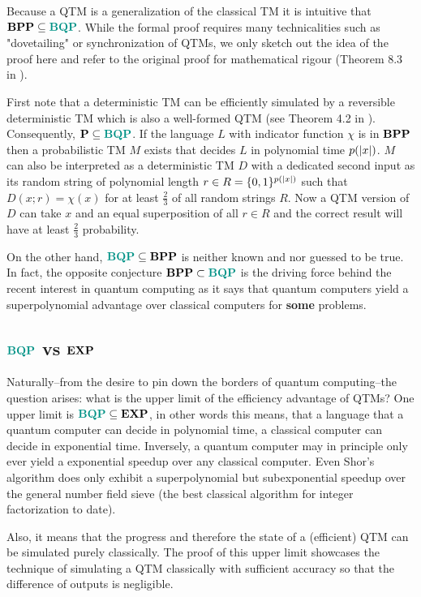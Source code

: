 Because a \ac{QTM} is a generalization of the classical \ac{TM} it is intuitive that $\BPP\subseteq\BQP$.
While the formal proof requires many technicalities such as "dovetailing" or synchronization of  \acp{QTM}, we only sketch out the idea of the proof here and refer to the original proof for mathematical rigour (Theorem 8.3 in \cite{bernstein_vazirani_1997}).

First note that a deterministic \ac{TM} can be efficiently simulated by a reversible deterministic \ac{TM} which is also a well-formed \ac{QTM} (see Theorem 4.2 in \cite{bernstein_vazirani_1997}).
Consequently, $\P\subseteq\BQP$.
If the language $L$ with indicator function $\chi$ is in $\mathbf{BPP}$ then a probabilistic \ac{TM} $M$ exists that decides $L$ in polynomial time $p(\left\vert x\right\vert)$.
$M$ can also be interpreted as a deterministic \ac{TM} $D$ with a dedicated second input as its random string of polynomial length $r\in R=\{0,1\}^{p(\left\vert x\right\vert)}$ such that $D(x;r)=\chi(x)$ for at least $\frac{2}{3}$ of all random strings $R$.
Now a \ac{QTM} version of $D$ can take $x$ and an equal superposition of all $r\in R$ and the correct result will have at least $\frac{2}{3}$ probability.

On the other hand, $\BQP\subseteq\BPP$ is neither known and nor guessed to be true.
In fact, the opposite conjecture $\BPP\subset\BQP$ is the driving force behind the recent interest in quantum computing as it says that quantum computers yield a superpolynomial advantage over classical computers for \textbf{some} problems.

\subsection{$\BQP$ vs $\mathbf{EXP}$}

Naturally--from the desire to pin down the borders of quantum computing--the question arises: what is the upper limit of the efficiency advantage of \acp{QTM}?
One upper limit is $\BQP\subseteq\EXP$, in other words this means, that a language that a quantum computer can decide in polynomial time, a classical computer can decide in exponential time.
Inversely, a quantum computer may in principle only ever yield a exponential speedup over any classical computer.
Even Shor's algorithm \cite{shor_1997} does only exhibit a superpolynomial but subexponential speedup over the general number field sieve (the best classical algorithm for integer factorization to date).

Also, it means that the progress and therefore the state of a (efficient) \ac{QTM} can be simulated purely classically.
The proof of this upper limit showcases the technique of simulating a \ac{QTM} classically with sufficient accuracy so that the difference of outputs is negligible.

